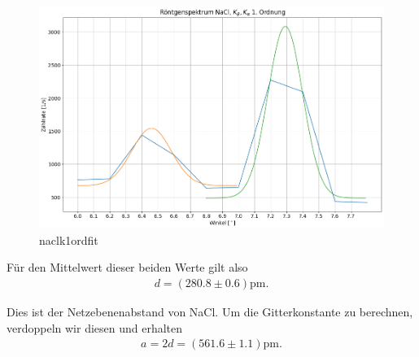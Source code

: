 \begin{figure}[H]
  \centering
  \includegraphics[width=.9\textwidth]{files/plots/nacl_k_1ord_fit.png}
  \caption{naclk1ordfit}
  \label{fig:nacl_k_1ord_fit}
\end{figure}


Für den Mittelwert dieser beiden Werte gilt also
\begin{align}
  d = (280.8 \pm 0.6)\si{\pico\meter}.
\end{align}

Dies ist der Netzebenenabstand von NaCl. Um die Gitterkonstante zu berechnen, verdoppeln wir diesen und erhalten
\begin{align}
  a = 2d = (561.6 \pm 1.1)\si{\pico\meter}.
\end{align}